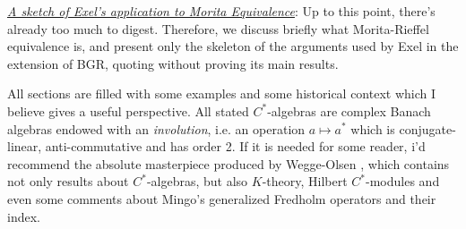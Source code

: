 \begin{itroman}
	\item \underline{\textit{A sketch of Exel's application to Morita Equivalence}}: Up to this point, there's already too much to digest. Therefore, we discuss briefly what Morita-Rieffel equivalence is, and present only the skeleton of the arguments used by Exel in the extension of BGR, quoting without proving its main results.      
\end{itroman}
\thispagestyle{empty}
All sections are filled with some examples and some historical context which I believe gives a useful perspective. All stated $C^*$-algebras are complex Banach algebras endowed with an \textit{involution}, i.e. an operation $a \longmapsto a^*$ which is  conjugate-linear, anti-commutative and has order 2. If it is needed for some reader, i'd recommend the absolute masterpiece produced by Wegge-Olsen \cite{wegge1993k}, which contains not only results about $C^*$-algebras, but also $K$-theory, Hilbert $C^*$-modules and even some comments about Mingo's generalized Fredholm operators and their index. 


\thispagestyle{empty}